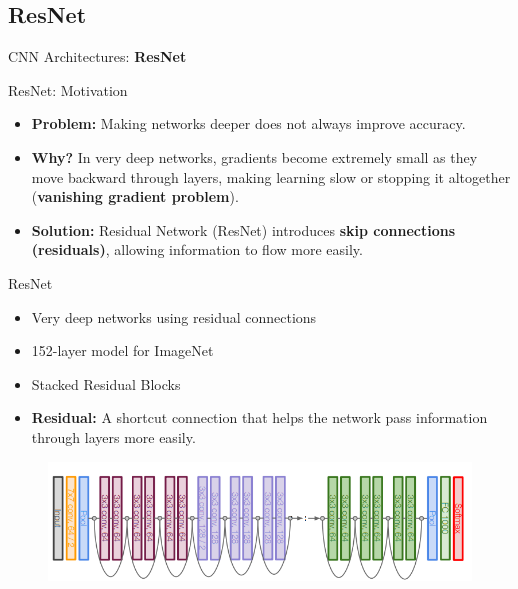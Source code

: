 \subsection{ResNet}
\begin{frame}{}
    \LARGE CNN Architectures: \textbf{ResNet}
\end{frame}

\begin{frame}{ResNet: Motivation}
    \begin{itemize}
        \item \textbf{Problem:} Making networks deeper does not always improve accuracy.
        \item \textbf{Why?} In very deep networks, gradients become extremely small as they move backward through layers, making learning slow or stopping it altogether (\textbf{vanishing gradient problem}).
        \item \textbf{Solution:} Residual Network (ResNet) introduces \textbf{skip connections (residuals)}, allowing information to flow more easily.
    \end{itemize}
\end{frame}

\begin{frame}{ResNet}
    \begin{itemize}
        \item Very deep networks using residual connections
        \item 152-layer model for ImageNet
        \item Stacked Residual Blocks
        \item \textbf{Residual:} A shortcut connection that helps the network pass information through layers more easily.
    \end{itemize}

    \begin{figure}
        \centering
        \includegraphics[width=1.0\textwidth,height=0.6\textheight,keepaspectratio]{images/cnn/resnet_1.png}
    \end{figure}
\end{frame}

